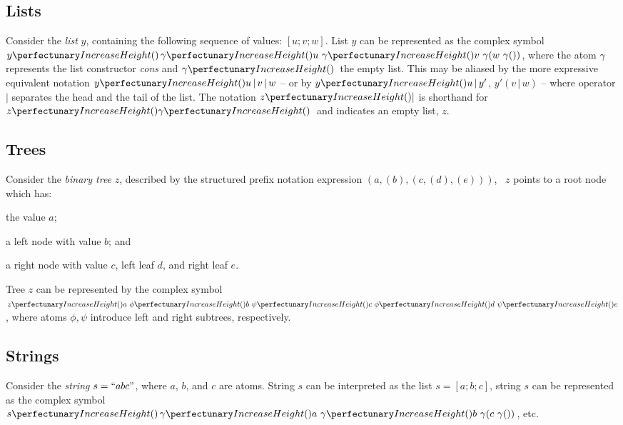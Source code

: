 \subsection{\label{sec:cps:lists}Lists}
Consider the \emph{list} \(y\), containing the following sequence of values: 
\([u; v; w]\). 
List \(y\) can be represented as the complex symbol
\(\cpfunc{y}{\, \cpfunc{\gamma}{u~\cpfunc{\gamma}{v~\cpfunc*{\gamma}{w~\cpfunc*{\gamma}{}}}}}\), 
where the \adhoc{} atom \(\gamma\) represents the list constructor \emph{cons} and \(\cpfunc{\gamma}{\,}\) the empty list.
This may be aliased by the more expressive equivalent notation
\(\cpfunc{y}{u\,|\,v\,|\,w}\)
-- or by \(\cpfunc{y}{u\,|\,y'}\), \(y'(v\,|\,w)\) --
where operator \(\mid\) separates the head and the tail of the list.
The notation \(\cpfunc{z}{|}\) is shorthand for \(\cpfunc{z}{\cpfunc{\gamma}{\,}}\) and indicates an empty list, \(z\).

\subsection{Trees}
Consider the \emph{binary tree} \(z\), described by the structured prefix notation expression 
\((a, (b), (c, (d), (e)))\), 
\ie{}~\(z\) points to a root node which has: 
\begin{inparaenum}[(i)]
\item the value \(a\); 
\item a left node with value \(b\); and 
\item a right node with value \(c\), left leaf \(d\), and right leaf \(e\). 
\end{inparaenum}
Tree \(z\) can be represented by the complex symbol
\(\cpfunc{z}{a ~ \cpfunc{\phi}{b} ~ \cpfunc{\psi}{c ~ \cpfunc{\phi}{d} ~ \cpfunc{\psi}{e}}}\), 
where \adhoc{} atoms \(\phi, \psi\) introduce left and right subtrees, respectively.

\subsection{Strings}
Consider the \emph{string} \(s = ``abc"\), 
where \(a\), \(b\), and \(c\) are atoms. 
String \(s\) can be interpreted as the list \(s = [a; b; c]\), \ie{}
string \(s\) can be represented as the complex symbol
\(\cpfunc{s}{\, \cpfunc{\gamma}{a~\cpfunc{\gamma}{b~\cpfunc*{\gamma}{c~\cpfunc*{\gamma}{}}}}}\), etc.